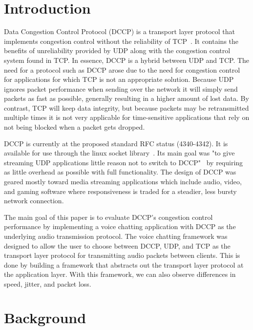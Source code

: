 \documentclass[letterpaper, 9 pt, balance, conference]{ieeeconf}
\begin{document}
\section{Introduction}
\label{sec:intro}

Data Congestion Control Protocol (DCCP) is a transport layer protocol that implements congestion control without the reliability of TCP~\cite{kohler06}. It contains the benefits of unreliability provided by UDP along with the congestion control system found in TCP. In essence, DCCP is a hybrid between UDP and TCP. The need for a protocol such as DCCP arose due to the need for congestion control for applications for which TCP is not an appropriate solution. Because UDP ignores packet performance when sending over the network it will simply send packets as fast as possible, generally resulting in a higher amount of lost data. By contrast, TCP will keep data integrity, but because packets may be retransmitted multiple times it is not very applicable for time-sensitive applications that rely on not being blocked when a packet gets dropped.

DCCP is currently at the proposed standard RFC status (4340-4342). It is available for use through the linux socket library~\cite{dccp_website}. Its main goal was "to give streaming UDP applications little reason not to switch to DCCP"~\cite{dccp_wg} by requiring as little overhead as possible with full functionality. The design of DCCP was geared mostly toward media streaming applications which include audio, video, and gaming software where responsiveness is traded for a steadier, less bursty network connection.

The main goal of this paper is to evaluate DCCP's congestion control performance by implementing a voice chatting application with DCCP as the underlying audio transmission protocol.  The voice chatting framework was designed to allow the user to choose between DCCP, UDP, and TCP as the transport layer protocol for transmitting audio packets between clients. This is done by building a framework that abstracts out the transport layer protocol at the application layer. With this framework, we can also observe differences in speed, jitter, and packet loss.

\section{Background}
\label{sec:backg}
\end{document}
